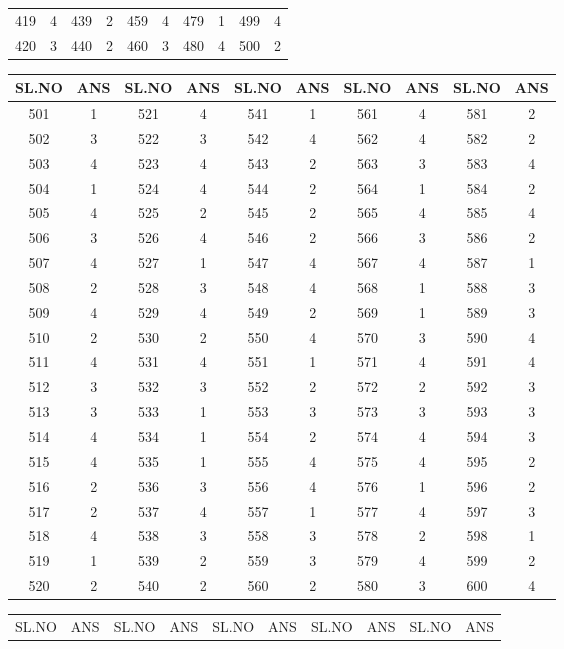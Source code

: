 {\begin{tabular}{|c|c||c|c||c|c||c|c||c|c|}
419 & 4 & 439 & 2 & 459 & 4 & 479 & 1 & 499 & 4 \\
420 & 3 & 440 & 2 & 460 & 3 & 480 & 4 & 500 & 2 \\
\hline
\end{tabular}\par\bigskip
\begin{tabular}{|c|c||c|c||c|c||c|c||c|c|}
\hline
SL.NO & ANS & SL.NO & ANS & SL.NO & ANS & SL.NO & ANS & SL.NO & ANS \\
\hline
501 & 1 & 521 & 4 & 541 & 1 & 561 & 4 & 581 & 2 \\
502 & 3 & 522 & 3 & 542 & 4 & 562 & 4 & 582 & 2 \\
503 & 4 & 523 & 4 & 543 & 2 & 563 & 3 & 583 & 4 \\
504 & 1 & 524 & 4 & 544 & 2 & 564 & 1 & 584 & 2 \\
505 & 4 & 525 & 2 & 545 & 2 & 565 & 4 & 585 & 4 \\
506 & 3 & 526 & 4 & 546 & 2 & 566 & 3 & 586 & 2 \\
507 & 4 & 527 & 1 & 547 & 4 & 567 & 4 & 587 & 1 \\
508 & 2 & 528 & 3 & 548 & 4 & 568 & 1 & 588 & 3 \\
509 & 4 & 529 & 4 & 549 & 2 & 569 & 1 & 589 & 3 \\
510 & 2 & 530 & 2 & 550 & 4 & 570 & 3 & 590 & 4 \\
511 & 4 & 531 & 4 & 551 & 1 & 571 & 4 & 591 & 4 \\
512 & 3 & 532 & 3 & 552 & 2 & 572 & 2 & 592 & 3 \\
513 & 3 & 533 & 1 & 553 & 3 & 573 & 3 & 593 & 3 \\
514 & 4 & 534 & 1 & 554 & 2 & 574 & 4 & 594 & 3 \\
515 & 4 & 535 & 1 & 555 & 4 & 575 & 4 & 595 & 2 \\
516 & 2 & 536 & 3 & 556 & 4 & 576 & 1 & 596 & 2 \\
517 & 2 & 537 & 4 & 557 & 1 & 577 & 4 & 597 & 3 \\
518 & 4 & 538 & 3 & 558 & 3 & 578 & 2 & 598 & 1 \\
519 & 1 & 539 & 2 & 559 & 3 & 579 & 4 & 599 & 2 \\
520 & 2 & 540 & 2 & 560 & 2 & 580 & 3 & 600 & 4 \\
\hline
\end{tabular}\par\bigskip
\begin{tabular}{|c|c||c|c||c|c||c|c||c|c|}
\hline
SL.NO & ANS & SL.NO & ANS & SL.NO & ANS & SL.NO & ANS & SL.NO & ANS \\

\end{tabular}}
